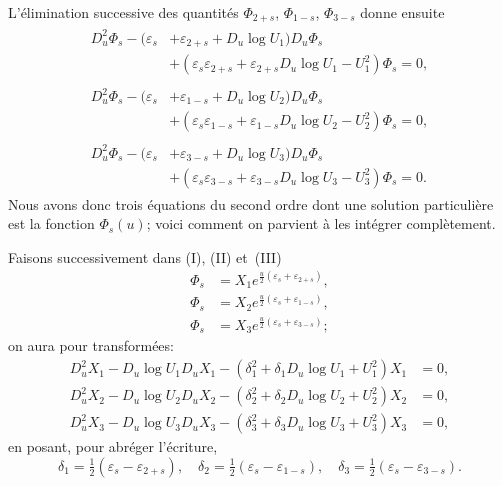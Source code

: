 \documentclass[11pt,leqno,oneside,letterpaper]{book}[2005/09/16]
\begin{document}
L'\'elimination successive des quantit\'es $\Phi_{2+s}$, $\Phi_{1-s}$, $\Phi_{3-s}$ donne ensuite
\begin{gather*}
\tag*{(I)}
\begin{split}
D_u^2\Phi_s-(\varepsilon_s&+\varepsilon_{2+s}+D_u\log U_1)D_u\Phi_s \\ &+
  (\varepsilon_s\varepsilon_{2+s}+\varepsilon_{2+s}D_u\log U_1-U_1^2)\Phi_s=0,
\end{split} \\
\tag*{(II)}
\begin{split}
D_u^2\Phi_s-(\varepsilon_s&+\varepsilon_{1-s}+D_u\log U_2)D_u\Phi_s \\ &+
  (\varepsilon_s\varepsilon_{1-s}+\varepsilon_{1-s}D_u\log U_2-U_2^2)\Phi_s=0,
\end{split} \\
\tag*{(III)}
\begin{split}
D_u^2\Phi_s-(\varepsilon_s&+\varepsilon_{3-s}+D_u\log U_3)D_u\Phi_s \\&+
  (\varepsilon_s\varepsilon_{3-s}+\varepsilon_{3-s}D_u\log U_3-U_3^2)\Phi_s=0.
\end{split}
\end{gather*}
Nous avons donc trois \'equations du second ordre dont une solution particuli\`ere
est la fonction $\Phi_s(u)$; voici comment on parvient \`a les int\'egrer compl\`etement.
\medskip

Faisons successivement dans (I), (II) et~(III)
\begin{align*}
\Phi_s &= X_1e^{\frac{u}{2}(\varepsilon_s+\varepsilon_{2+s})},\\
\Phi_s &= X_2e^{\frac{u}{2}(\varepsilon_s+\varepsilon_{1-s})},\\
\Phi_s &= X_3e^{\frac{u}{2}(\varepsilon_s+\varepsilon_{3-s})};
\end{align*}
on aura pour transform\'ees:
\begin{align*}
D_u^2X_1-D_u\log U_1D_uX_1-(\delta_1^2+\delta_1D_u\log U_1+U_1^2)X_1&=0,\\
D_u^2X_2-D_u\log U_2D_uX_2-(\delta_2^2+\delta_2D_u\log U_2+U_2^2)X_2&=0,\\
D_u^2X_3-D_u\log U_3D_uX_3-(\delta_3^2+\delta_3D_u\log U_3+U_3^2)X_3&=0,
\end{align*}
en posant, pour abr\'eger l'\'ecriture,
\[
\delta_1 = \tfrac{1}{2}(\varepsilon_s-\varepsilon_{2+s}),\quad
  \delta_2 = \tfrac{1}{2}(\varepsilon_s-\varepsilon_{1-s}),\quad
  \delta_3 = \tfrac{1}{2}(\varepsilon_s-\varepsilon_{3-s}).
\]
\end{document}
